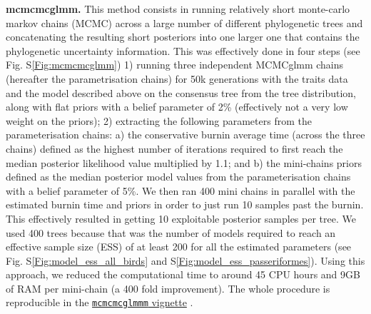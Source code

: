 \documentclass[12pt,letterpaper]{article}
\begin{document}
\textbf{mcmcmcglmm.}
This method consists in running relatively short monte-carlo markov chains (MCMC) across a large number of different phylogenetic trees and concatenating the resulting short posteriors into one larger one that contains the phylogenetic uncertainty information.
This was effectively done in four steps (see Fig. S\ref{Fig:mcmcmcglmm})
1) running three independent MCMCglmm chains (hereafter the parametrisation chains) for 50k generations with the traits data and the model described above on the consensus tree from the tree distribution, along with flat priors with a belief parameter of 2\% (effectively not a very low weight on the priors);
2) extracting the following parameters from the parameterisation chains:
a) the conservative burnin average time (across the three chains) defined as the highest number of iterations required to first reach the median posterior likelihood value multiplied by 1.1; and
b) the mini-chains priors defined as the median posterior model values from the parameterisation chains with a belief parameter of 5\%.
We then ran 400 mini chains in parallel with the estimated burnin time and priors in order to just run 10 samples past the burnin.
This effectively resulted in getting 10 exploitable posterior samples per tree.
We used 400 trees because that was the number of models required to reach an effective sample size (ESS) of at least 200 for all the estimated parameters (see Fig. S\ref{Fig:model_ess_all_birds} and S\ref{Fig:model_ess_passeriformes}).
Using this approach, we reduced the computational time to around 45 CPU hours and 9GB of RAM per mini-chain (a 400 fold improvement).
The whole procedure is reproducible in the \href{https://raw.rawgit.net/TGuillerme/mcmcmcglmmm/main/inst/MCMCglmm_mini_chains.html}{\texttt{mcmcmcglmmm} vignette} \cite{mcmcmcglmmm}.
\end{document}
